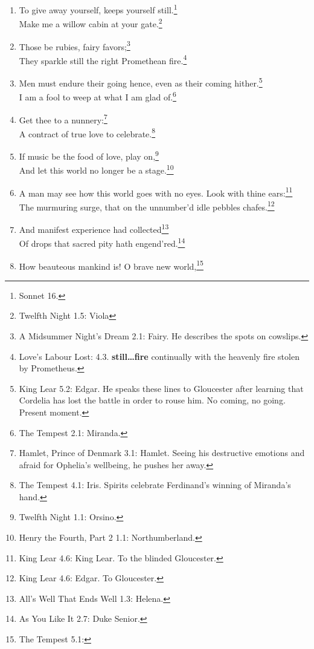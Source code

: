 \documentclass[17pt,twoside]{extarticle}
\begin{document}
\begin{enumerate}
{    her past.}\\So full of shapes is fancy that it alone is high
  fantastical.\footnote{Twelfth Night 1.1: Duke Orsino. He sees the
    fleeting nature of romantic love.}
\item
  To give away yourself, keeps yourself still.\footnote{Sonnet 16.}\\Make
  me a willow cabin at your gate.\footnote{Twelfth Night 1.5: Viola}
\item
  Those be rubies, fairy favors;\footnote{A Midsummer Night's Dream 2.1:
    Fairy. He describes the spots on cowslips.}\\They sparkle still the
  right Promethean fire.\footnote{Love's Labour Lost: 4.3.
    \textbf{still\ldots{}fire} continually with the heavenly fire stolen
    by Prometheus.}
\item
  Men must endure their going hence, even as their coming
  hither.\footnote{King Lear 5.2: Edgar. He speaks these lines to
    Gloucester after learning that Cordelia has lost the battle in order
    to rouse him. No coming, no going. Present moment.}\\I am a fool to
  weep at what I am glad of.\footnote{The Tempest 2.1: Miranda.}
\item
  Get thee to a nunnery:\footnote{Hamlet, Prince of Denmark 3.1: Hamlet.
    Seeing his destructive emotions and afraid for Ophelia's wellbeing,
    he pushes her away.}\\A contract of true love to
  celebrate.\footnote{The Tempest 4.1: Iris. Spirits celebrate
    Ferdinand's winning of Miranda's hand.}
\item
  If music be the food of love, play on,\footnote{Twelfth Night 1.1:
    Orsino.}\\And let this world no longer be a stage.\footnote{Henry
    the Fourth, Part 2 1.1: Northumberland.}
\item
  A man may see how this world goes with no eyes. Look with thine
  ears:\footnote{King Lear 4.6: King Lear. To the blinded Gloucester.}\\The
  murmuring surge, that on the unnumber'd idle pebbles chafes.\footnote{King
    Lear 4.6: Edgar. To Gloucester.}
\item
  And manifest experience had collected\footnote{All's Well That Ends
    Well 1.3: Helena.}\\Of drops that sacred pity hath
  engend'red.\footnote{As You Like It 2.7: Duke Senior.}
\item
  How beauteous mankind is! O brave new world,\footnote{The Tempest 5.1:
}
\end{enumerate}
\end{document}
